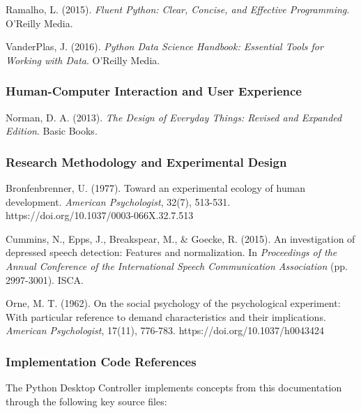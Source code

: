 \documentclass[12pt,a4paper]{article}
\begin{document}
Ramalho, L. (2015). \textit{Fluent Python: Clear, Concise, and Effective Programming}. O'Reilly Media.

VanderPlas, J. (2016). \textit{Python Data Science Handbook: Essential Tools for Working with Data}. O'Reilly Media.

\subsubsection{Human-Computer Interaction and User Experience}

Norman, D. A. (2013). \textit{The Design of Everyday Things: Revised and Expanded Edition}. Basic Books.

\subsubsection{Research Methodology and Experimental Design}

Bronfenbrenner, U. (1977). Toward an experimental ecology of human development. \textit{American Psychologist}, 32(7),
513-531. https://doi.org/10.1037/0003-066X.32.7.513

Cummins, N., Epps, J., Breakspear, M., \& Goecke, R. (2015). An investigation of depressed speech detection: Features and
normalization. In \textit{Proceedings of the Annual Conference of the International Speech Communication Association} (pp.
2997-3001). ISCA.

Orne, M. T. (1962). On the social psychology of the psychological experiment: With particular reference to demand
characteristics and their implications. \textit{American Psychologist}, 17(11), 776-783. https://doi.org/10.1037/h0043424

\subsubsection{Implementation Code References}

The Python Desktop Controller implements concepts from this documentation through the following key source files:
\end{document}
